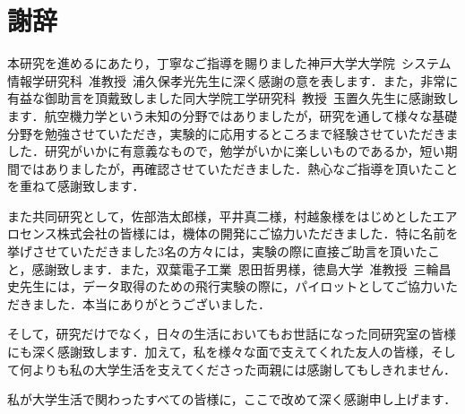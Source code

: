 
\chapter*{謝辞}

本研究を進めるにあたり，丁寧なご指導を賜りました神戸大学大学院~システム情報学研究科~准教授~浦久保孝光先生に深く感謝の意を表します．また，非常に有益な御助言を頂戴致しました同大学院工学研究科~教授~玉置久先生に感謝致します．航空機力学という未知の分野ではありましたが，研究を通して様々な基礎分野を勉強させていただき，実験的に応用するところまで経験させていただきました．研究がいかに有意義なもので，勉学がいかに楽しいものであるか，短い期間ではありましたが，再確認させていただきました．熱心なご指導を頂いたことを重ねて感謝致します．

また共同研究として，佐部浩太郎様，平井真二様，村越象様をはじめとしたエアロセンス株式会社の皆様には，機体の開発にご協力いただきました．特に名前を挙げさせていただきました3名の方々には，実験の際に直接ご助言を頂いたこと，感謝致します．また，双葉電子工業~恩田哲男様，徳島大学~准教授~三輪昌史先生には，データ取得のための飛行実験の際に，パイロットとしてご協力いただきました．本当にありがとうございました．

そして，研究だけでなく，日々の生活においてもお世話になった同研究室の皆様にも深く感謝致します．加えて，私を様々な面で支えてくれた友人の皆様，そして何よりも私の大学生活を支えてくださった両親には感謝してもしきれません．

私が大学生活で関わったすべての皆様に，ここで改めて深く感謝申し上げます．

\newpage

